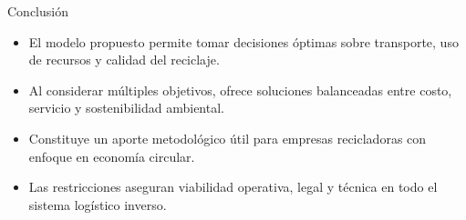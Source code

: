 \documentclass{beamer}
\begin{document}
\begin{frame}{Conclusión}
\begin{itemize}
  \item El modelo propuesto permite tomar decisiones óptimas sobre transporte, uso de recursos y calidad del reciclaje.
  \item Al considerar múltiples objetivos, ofrece soluciones balanceadas entre costo, servicio y sostenibilidad ambiental.
  \item Constituye un aporte metodológico útil para empresas recicladoras con enfoque en economía circular.
  \item Las restricciones aseguran viabilidad operativa, legal y técnica en todo el sistema logístico inverso.
\end{itemize}
\end{frame}
\end{document}
